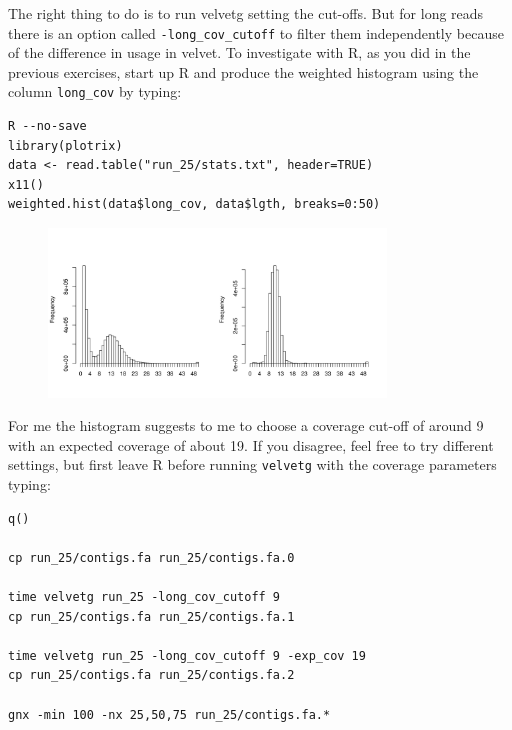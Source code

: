 \begin{steps}
The right thing to do is to run velvetg setting the cut-offs. But for long reads
there is an option called \texttt{-long\_cov\_cutoff} to filter them
independently because of the difference in usage in velvet. To investigate with
R, as you did in the previous exercises, start up R and produce the weighted
histogram using the column \texttt{long\_cov} by typing:
\begin{lstlisting}
R --no-save
library(plotrix) 
data <- read.table("run_25/stats.txt", header=TRUE) 
x11() 
weighted.hist(data$long_cov, data$lgth, breaks=0:50)
\end{lstlisting}

\begin{figure}[H]
\centering
\includegraphics[width=0.8\textwidth]{de_novo/velvet_Rplot002.png}
\label{fig:velvet_Rplot002}
\end{figure}

For me the histogram suggests to me to choose a coverage cut-off of around 9
with an expected coverage of about 19. If you disagree, feel free to try
different settings, but first leave R before running \texttt{velvetg} with the
coverage parameters typing:
\begin{lstlisting}
q()

cp run_25/contigs.fa run_25/contigs.fa.0

time velvetg run_25 -long_cov_cutoff 9
cp run_25/contigs.fa run_25/contigs.fa.1

time velvetg run_25 -long_cov_cutoff 9 -exp_cov 19
cp run_25/contigs.fa run_25/contigs.fa.2

gnx -min 100 -nx 25,50,75 run_25/contigs.fa.*
\end{lstlisting}

\end{steps}


